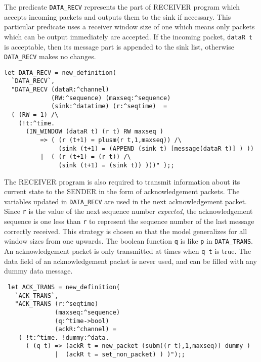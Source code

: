 The predicate \verb+DATA_RECV+ represents the part of RECEIVER program which
accepts incoming packets and outputs them to the sink if necessary.
This particular predicate uses a receiver window size of one which means
only packets which can be output immediately are accepted.  If the incoming
packet, \verb+dataR t+ is acceptable, then its message part is appended to
the sink list, otherwise \verb+DATA_RECV+ makes no changes.

\begin{session}
\begin{verbatim}
let DATA_RECV = new_definition( 
  `DATA_RECV`, 
  "DATA_RECV (dataR:^channel)
             (RW:^sequence) (maxseq:^sequence) 
             (sink:^datatime) (r:^seqtime)  =
  ( (RW = 1) /\
    (!t:^time.  
      (IN_WINDOW (dataR t) (r t) RW maxseq ) 
          => ( (r (t+1) = plusm(r t,1,maxseq)) /\ 
               (sink (t+1) = (APPEND (sink t) [message(dataR t)] ) )) 
          |  ( (r (t+1) = (r t)) /\ 
               (sink (t+1) = (sink t)) )))" );;
\end{verbatim}
\end{session}

The RECEIVER program is also required to transmit information about its
current state to the SENDER in the form of acknowledgement packets.
The variables updated in \verb+DATA_RECV+ are used in the next acknowledgement
packet. Since \verb+r+ is the value of the next sequence 
number {\em expected}, the
acknowledgement sequence is one less than \verb+r+ to represent the sequence
number of the last message correctly received.  This strategy is chosen
so that the model generalizes for all window sizes from one
upwards.  The boolean 
function \verb+q+ is like \verb+p+ in \verb+DATA_TRANS+.  
An acknowledgement packet is only transmitted at
times when \verb+q t+ is true.
The data field of an acknowledgement packet is never used, and can be
filled with any dummy data message.

\begin{session}
\begin{verbatim}
 let ACK_TRANS = new_definition(
   `ACK_TRANS`,                                                          
   "ACK_TRANS (r:^seqtime) 
              (maxseq:^sequence)
              (q:^time->bool)
              (ackR:^channel) = 
    ( !t:^time. !dummy:^data.
      ( (q t) => (ackR t = new_packet (subm((r t),1,maxseq)) dummy )
              |  (ackR t = set_non_packet) ) )");;    
\end{verbatim}
\end{session}

